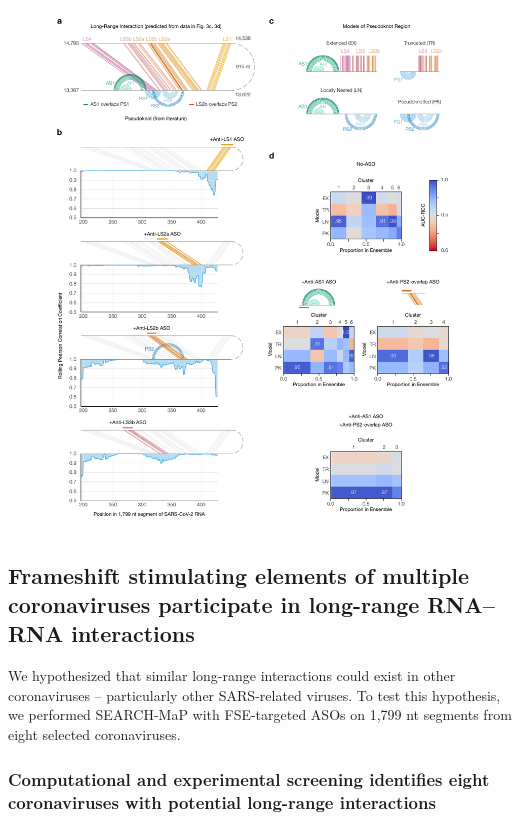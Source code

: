 \documentclass[main.tex]{subfiles}
\begin{document}
\begin{figure}[ht]
	\includegraphics[width=\textwidth]{../MainFigures/lnas/lnas.pdf}
	\caption{}
	\label{lnas}
\end{figure}


\subsection{Frameshift stimulating elements of multiple coronaviruses participate in long-range RNA--RNA interactions}

We hypothesized that similar long-range interactions could exist in other coronaviruses -- particularly other SARS-related viruses.
To test this hypothesis, we performed SEARCH-MaP with FSE-targeted ASOs on 1,799 nt segments from eight selected coronaviruses.


\subsubsection{Computational and experimental screening identifies eight coronaviruses with potential long-range interactions}
\end{document}
